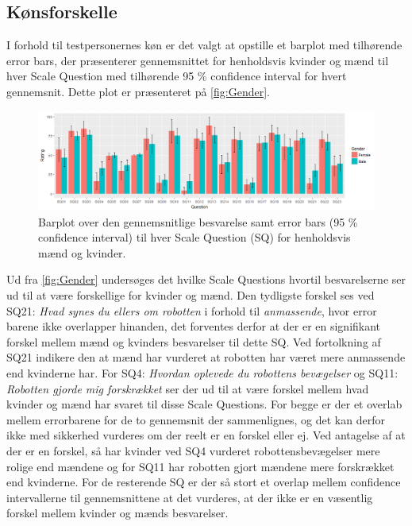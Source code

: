 \subsection{Kønsforskelle}
%
I forhold til testpersonernes køn er det valgt at opstille et barplot med tilhørende error bars, der præsenterer gennemsnittet for henholdsvis kvinder og mænd til hver Scale Question med tilhørende 95 \% confidence interval for hvert gennemsnit. Dette plot er præsenteret på \autoref{fig:Gender}. 
%
\begin{figure}[H]
\centering
\includegraphics[width = \textwidth]{Figure/DatabehandlingSkalaer/Demografi/GenderBarPlotErrorBars} 
\caption{Barplot over den gennemsnitlige besvarelse samt error bars (95 \% confidence interval) til hver Scale Question (SQ) for henholdsvis mænd og kvinder.}
\label{fig:Gender}
\end{figure}
\noindent
%
Ud fra \autoref{fig:Gender} undersøges det hvilke Scale Questions hvortil besvarelserne ser ud til at være forskellige for kvinder og mænd. Den tydligste forskel ses ved SQ21: \textit{Hvad synes du ellers om robotten} i forhold til \textit{anmassende}, hvor error barene ikke overlapper hinanden, det forventes derfor at der er en signifikant forskel mellem mænd og kvinders besvarelser til dette SQ. Ved fortolkning af SQ21 indikere den at mænd har vurderet at robotten har været mere anmassende end kvinderne har. \blankline
%
For SQ4: \textit{Hvordan oplevede du robottens bevægelser} og SQ11: \textit{Robotten gjorde mig forskrækket} ser der ud til at være forskel mellem hvad kvinder og mænd har svaret til disse Scale Questions. For begge er der et overlab mellem errorbarene for de to gennemsnit der sammenlignes, og det kan derfor ikke med sikkerhed vurderes om der reelt er en forskel eller ej. Ved antagelse af at der er en forskel, så har kvinder ved SQ4 vurderet robottensbevægelser mere rolige end mændene og for SQ11 har robotten gjort mændene mere forskrækket end kvinderne.\blankline
%
For de resterende SQ er der så stort et overlap mellem confidence intervallerne til gennemsnittene at det vurderes, at der ikke er en væsentlig forskel mellem kvinder og mænds besvarelser. 
